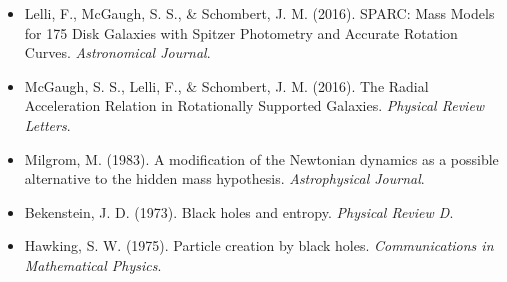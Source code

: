 \documentclass[
]{article}
\providecommand{\tightlist}{%
  \setlength{\itemsep}{0pt}\setlength{\parskip}{0pt}}
\begin{document}
\begin{itemize}
\tightlist
\item
  Lelli, F., McGaugh, S. S., \& Schombert, J. M. (2016). SPARC: Mass
  Models for 175 Disk Galaxies with Spitzer Photometry and Accurate
  Rotation Curves. \emph{Astronomical Journal}.
\item
  McGaugh, S. S., Lelli, F., \& Schombert, J. M. (2016). The Radial
  Acceleration Relation in Rotationally Supported Galaxies.
  \emph{Physical Review Letters}.
\item
  Milgrom, M. (1983). A modification of the Newtonian dynamics as a
  possible alternative to the hidden mass hypothesis.
  \emph{Astrophysical Journal}.
\item
  Bekenstein, J. D. (1973). Black holes and entropy. \emph{Physical
  Review D}.
\item
  Hawking, S. W. (1975). Particle creation by black holes.
  \emph{Communications in Mathematical Physics}.
\end{itemize}
\end{document}
